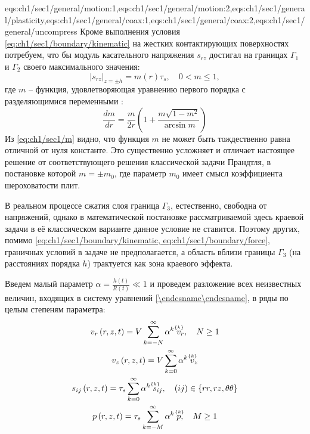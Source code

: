 \expandafter\gdef\csname eqs:ch1/sec1/general\endcsname{eqs:ch1/sec1/general/motion:1,eqs:ch1/sec1/general/motion:2,eqs:ch1/sec1/general/plasticity,eqs:ch1/sec1/general/coax:1,eqs:ch1/sec1/general/coax:2,eqs:ch1/sec1/general/uncompress}
Кроме выполнения условия \cref{eq:ch1/sec1/boundary/kinematic} на жестких контактирующих поверхностях потребуем, что бы модуль касательного напряжения $s_{rz}$ достигал на границах $\Gamma_{1}$ и $\Gamma_{2}$ своего максимального значения:
\begin{equation}
  \label{eq:ch1/sec1/boundary/force}
  \lvert s_{rz}\lvert_{z=\pm h} = m(r) \tau_{s}, \quad 0 < m \le 1,
\end{equation}
где $m$ -- функция, удовлетворяющая уравнению первого порядка с разделяющимися переменными \autocite{Georgievsky:2008}:
\begin{equation}
  \label{eq:ch1/sec1/m}
  \frac{dm}{dr}=\frac{m}{2r}\left(1+\frac{m\sqrt{1-m^2}}{\arcsin m}\right)
\end{equation}
Из \cref{eq:ch1/sec1/m} видно, что функция $m$ не может быть тождественно равна отличной от нуля константе. Это существенно усложняет и отличает настоящее решение от соответствующего решения классической задачи Прандтля, в постановке которой $m = \pm m_0$, где параметр $m_0$  имеет смысл коэффициента шероховатости плит.

В реальном процессе сжатия слоя граница $\Gamma_{3}$, естественно, свободна от напряжений, однако в математической постановке рассматриваемой здесь краевой задачи в её классическом варианте данное условие не ставится. Поэтому других, помимо \cref{eq:ch1/sec1/boundary/kinematic, eq:ch1/sec1/boundary/force}, граничных условий в задаче не предполагается, а область вблизи границы $\Gamma_{3}$ (на расстояниях порядка $h$) трактуется как зона краевого эффекта.

Введем малый параметр $\alpha = \frac{h(t)}{R(t)} \ll 1$ и проведем разложение всех неизвестных величин, входящих в систему уравнений \cref{\csname eqs:ch1/sec1/general\endcsname}, в ряды по целым степеням параметра:
\begin{gather}
  \label{eqs:ch1/series/vr}
  v_{r}\left(r, z, t\right) = V \sum_{k=-N}^{\infty}{\alpha^{k} \; \uindex{v}{k}_{r}}, \quad N \ge 1
  \\
  \label{eqs:ch1/series/vz}
  v_{z}\left(r, z, t\right) = V \sum_{k=0}^{\infty}{\alpha^{k} \; \uindex{v}{k}_{z}}
  \\
  \label{eqs:ch1/series/sij}
  s_{ij}\left(r, z, t\right) = \tau_{s} \sum_{k=0}^{\infty}{\alpha^{k} \; \uindex{s}{k}_{ij}}, \quad (ij)\in\{rr, rz, \theta\theta\}
  \\
  \label{eqs:ch1/series/p}
  p\left(r, z, t \right) = \tau_{s} \sum_{k=-M}^{\infty}{\alpha^{k} \; \uindex{p}{k}}, \quad M \ge 1
\end{gather}

